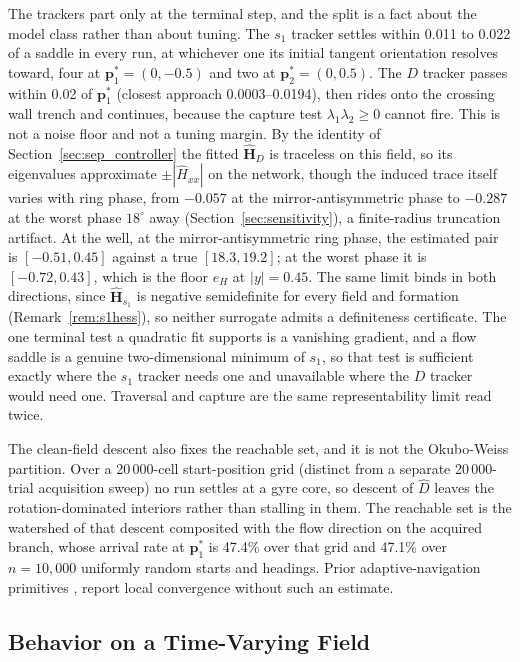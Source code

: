 \documentclass[lettersize,journal]{IEEEtran}
\begin{document}
The trackers part only at the terminal step, and the split is a fact about
the model class rather than about tuning. The $s_1$ tracker settles within
0.011 to 0.022 of a saddle in every run, at whichever one its initial
tangent orientation resolves toward, four at $\mathbf{p}^*_1 = (0, -0.5)$
and two at $\mathbf{p}^*_2 = (0, 0.5)$. The $D$ tracker passes within 0.02
of $\mathbf{p}^*_1$ (closest approach 0.0003--0.0194), then rides onto the
crossing wall trench and continues, because the capture test
$\lambda_1\lambda_2 \geq 0$ cannot fire. This is not a noise floor and not
a tuning margin. By the identity of Section~\ref{sec:sep_controller} the
fitted $\hat{\mathbf{H}}_D$ is traceless on this field, so its
eigenvalues approximate $\pm|\hat{H}_{xx}|$ on the network, though the
induced trace itself varies with ring phase, from $-0.057$ at the
mirror-antisymmetric phase to $-0.287$ at the worst phase $18^\circ$ away
(Section~\ref{sec:sensitivity}), a finite-radius truncation artifact. At
the well, at the mirror-antisymmetric ring phase, the estimated pair is
$[-0.51, 0.45]$ against a true $[18.3, 19.2]$; at the worst phase it is
$[-0.72, 0.43]$, which is the floor $e_H$ at $|y| = 0.45$. The same limit binds in
both directions, since $\hat{\mathbf{H}}_{s_1}$ is negative semidefinite
for every field and formation (Remark~\ref{rem:s1hess}), so neither
surrogate admits a definiteness certificate. The one terminal test a
quadratic fit supports is a vanishing gradient, and a flow saddle is a
genuine two-dimensional minimum of $s_1$, so that test is sufficient
exactly where the $s_1$ tracker needs one and unavailable where the $D$
tracker would need one. Traversal and capture are the same
representability limit read twice.

The clean-field descent also fixes the reachable set, and it is not the
Okubo-Weiss partition. Over a 20\,000-cell start-position grid (distinct
from a separate 20\,000-trial acquisition sweep) no
run settles at a
gyre core, so descent of $\hat{D}$ leaves the rotation-dominated
interiors rather than stalling in them. The reachable set is the
watershed of that descent composited with the flow direction on the
acquired branch, whose arrival rate at $\mathbf{p}^*_1$ is 47.4\% over
that grid and 47.1\% over $n = 10{,}000$ uniformly random starts and
headings. Prior adaptive-navigation primitives \cite{3}, \cite{4} report
local convergence without such an estimate.

\subsection{Behavior on a Time-Varying Field}
\label{sec:time_varying}
\end{document}
